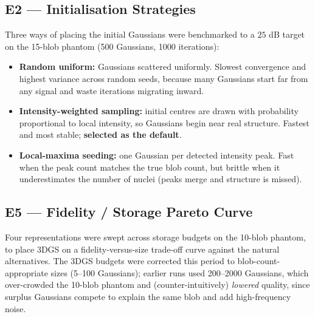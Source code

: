 \documentclass[11pt,a4paper]{article}
\begin{document}
\subsection{E2 --- Initialisation Strategies}

Three ways of placing the initial Gaussians were benchmarked to a \(25\) dB target on
the 15-blob phantom (500 Gaussians, 1000 iterations):

\begin{itemize}
    \item \textbf{Random uniform:} Gaussians scattered uniformly. Slowest convergence
    and highest variance across random seeds, because many Gaussians start far from any
    signal and waste iterations migrating inward.
    \item \textbf{Intensity-weighted sampling:} initial centres are drawn with
    probability proportional to local intensity, so Gaussians begin near real structure.
    Fastest and most stable; \textbf{selected as the default}.
    \item \textbf{Local-maxima seeding:} one Gaussian per detected intensity peak. Fast
    when the peak count matches the true blob count, but brittle when it underestimates
    the number of nuclei (peaks merge and structure is missed).
\end{itemize}

\subsection{E5 --- Fidelity / Storage Pareto Curve}

Four representations were swept across storage budgets on the 10-blob phantom, to place
3DGS on a fidelity-versus-size trade-off curve against the natural alternatives. The
3DGS budgets were corrected this period to blob-count-appropriate sizes (5--100
Gaussians); earlier runs used 200--2000 Gaussians, which over-crowded the 10-blob
phantom and (counter-intuitively) \emph{lowered} quality, since surplus Gaussians
compete to explain the same blob and add high-frequency noise.
\end{document}
